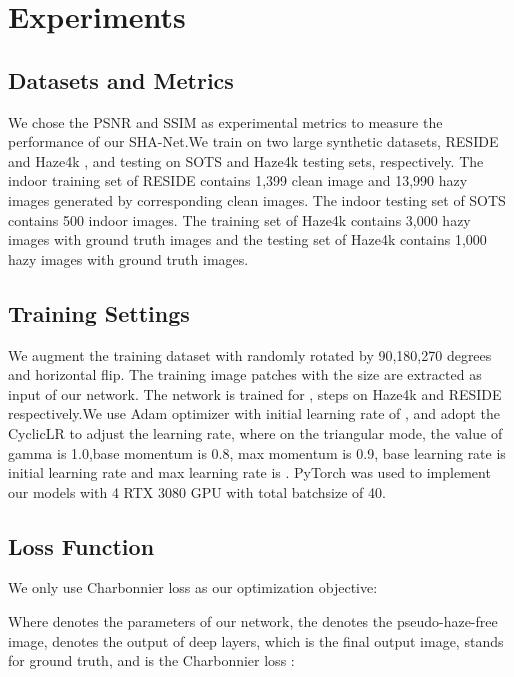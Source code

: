 \documentclass[final]{cvpr}
\begin{document}
\section{Experiments}

\subsection{Datasets and Metrics}
We chose the PSNR and SSIM as experimental metrics to measure the performance of our SHA-Net.We train on two large synthetic datasets, RESIDE \cite{SOTS} and Haze4k \cite{liu2021synthetic}, and testing on SOTS \cite{SOTS} and Haze4k \cite{liu2021synthetic} testing sets, respectively. The indoor training set of RESIDE \cite{SOTS} contains 1,399 clean image and 13,990 hazy images generated by corresponding clean images. The indoor testing set of SOTS contains 500 indoor images. The training set of Haze4k \cite{liu2021synthetic} contains 3,000 hazy images with ground truth images and the testing set of Haze4k \cite{liu2021synthetic} contains 1,000 hazy images with ground truth images.

\subsection{Training Settings}
We augment the training dataset with randomly rotated by 90,180,270 degrees and horizontal flip. The training image patches with the size  are extracted as input  of our network.
The network is trained for ,  steps on Haze4k \cite{liu2021synthetic} and RESIDE \cite{SOTS} respectively.We use Adam optimizer with initial learning rate of , and adopt the CyclicLR to adjust the learning rate, where on the triangular mode, the value of gamma is 1.0,base momentum is 0.8, max momentum is 0.9, base learning rate is initial learning rate and max learning rate is . PyTorch \cite{paszke2017automatic} was used to implement our models with 4 RTX 3080 GPU with total batchsize of 40.
\subsection{Loss Function}
We only use Charbonnier loss \cite{charbonnier1994two} as our optimization objective:

Where  denotes the parameters of our network, the  denotes the pseudo-haze-free image,  denotes the output of deep layers, which is the final output image,  stands for ground truth, and  is the Charbonnier loss \cite{charbonnier1994two}:
\end{document}
